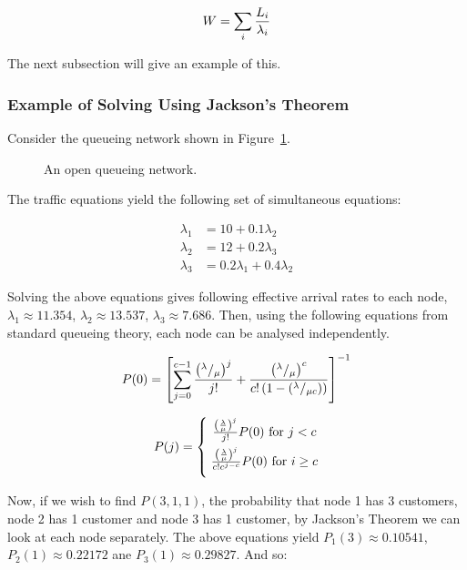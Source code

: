 \documentclass{article}
\begin{document}
\begin{equation}
    W = \sum_i {L_i \over \lambda_i}
\end{equation}

The next subsection will give an example of this.

\subsubsection{Example of Solving Using Jackson's Theorem}

Consider the queueing network shown in Figure~\ref{fig:jacksonnet}.

\begin{figure}[H]
    
    \caption{An open queueing network.}
    \label{fig:jacksonnet}
\end{figure}

The traffic equations yield the following set of simultaneous equations:

\begin{align*}
\lambda_1 &= 10 + 0.1 \lambda_2\\
\lambda_2 &= 12 + 0.2 \lambda_3\\
\lambda_3 &= 0.2 \lambda_1 + 0.4 \lambda_2
\end{align*}

Solving the above equations gives following effective arrival rates to each node, $\lambda_1 \approx 11.354$, $\lambda_2 \approx 13.537$, $\lambda_3 \approx 7.686$.
Then, using the following equations from standard queueing theory, each node can be analysed independently.

\begin{equation}
P(0) = \left[\sum_{j=0}^{c-1}{\left({^\lambda / _\mu}\right)^j\over j!}+{\left({^\lambda / _\mu}\right)^c\over c!\left(1-{\left(^\lambda / _{\mu c}\right)} \right)}\right]^{-1}
\end{equation}

\begin{equation}
P(j)=\left\{\;\begin{array}{@{}c@{}}
{\left(\frac{\lambda}{\mu}\right)^j\over j!}P(0)\text{ for }j<c\\[2mm]
{\left(\frac{\lambda}{\mu}\right)^j\over c!c^{j-c}}P(0)\text{ for }i\geq c\\[2mm]
\end{array}
\right.
\end{equation}

Now, if we wish to find $P(3, 1, 1)$, the probability that node 1 has 3
customers, node 2 has 1 customer and node 3 has 1 customer, by Jackson's Theorem
we can look at each node separately.
The above equations yield $P_1(3) \approx 0.10541$, $P_2(1) \approx 0.22172$ ane $P_3(1) \approx 0.29827$.
And so:
\end{document}
